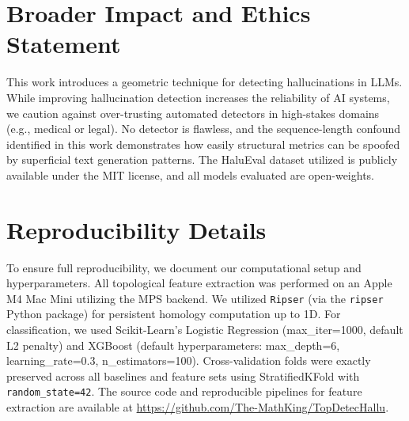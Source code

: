 \documentclass[11pt,a4paper]{article}
\begin{document}
\section{Broader Impact and Ethics Statement}
This work introduces a geometric technique for detecting hallucinations in LLMs. While improving hallucination detection increases the reliability of AI systems, we caution against over-trusting automated detectors in high-stakes domains (e.g., medical or legal). No detector is flawless, and the sequence-length confound identified in this work demonstrates how easily structural metrics can be spoofed by superficial text generation patterns. The HaluEval dataset utilized is publicly available under the MIT license, and all models evaluated are open-weights.




\appendix
\section{Reproducibility Details}
To ensure full reproducibility, we document our computational setup and hyperparameters. All topological feature extraction was performed on an Apple M4 Mac Mini utilizing the MPS backend. We utilized \texttt{Ripser} (via the \texttt{ripser} Python package) for persistent homology computation up to 1D. For classification, we used Scikit-Learn's Logistic Regression (max\_iter=1000, default L2 penalty) and XGBoost (default hyperparameters: max\_depth=6, learning\_rate=0.3, n\_estimators=100). Cross-validation folds were exactly preserved across all baselines and feature sets using StratifiedKFold with \texttt{random\_state=42}. The source code and reproducible pipelines for feature extraction are available at \url{https://github.com/The-MathKing/TopDetecHallu}.
\end{document}
